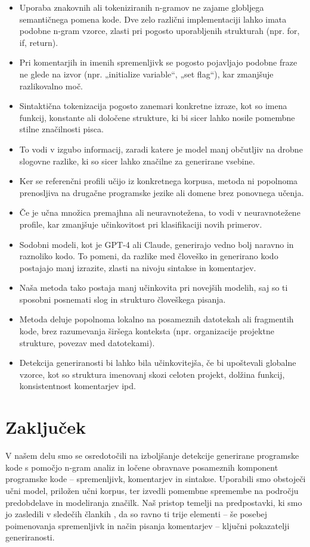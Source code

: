 \documentclass[sigconf,nonacm]{acmart}
\begin{document}
\begin{itemize}
	\item Uporaba znakovnih ali tokeniziranih n-gramov ne zajame globljega semantičnega pomena kode. Dve zelo različni implementaciji lahko imata podobne n-gram vzorce, zlasti pri pogosto uporabljenih strukturah (npr. for, if, return).
	\item Pri komentarjih in imenih spremenljivk se pogosto pojavljajo podobne fraze ne glede na izvor (npr. „initialize variable“, „set flag“), kar zmanjšuje razlikovalno moč.
	\item Sintaktična tokenizacija pogosto zanemari konkretne izraze, kot so imena funkcij, konstante ali določene strukture, ki bi sicer lahko nosile pomembne stilne značilnosti pisca.
	\item To vodi v izgubo informacij, zaradi katere je model manj občutljiv na drobne slogovne razlike, ki so sicer lahko značilne za generirane vsebine.
	\item Ker se referenčni profili učijo iz konkretnega korpusa, metoda ni popolnoma prenosljiva na drugačne programske jezike ali domene brez ponovnega učenja.
	\item Če je učna množica premajhna ali neuravnotežena, to vodi v neuravnotežene profile, kar zmanjšuje učinkovitost pri klasifikaciji novih primerov.
	\item Sodobni modeli, kot je GPT-4 ali Claude, generirajo vedno bolj naravno in raznoliko kodo. To pomeni, da razlike med človeško in generirano kodo postajajo manj izrazite, zlasti na nivoju sintakse in komentarjev.
	\item Naša metoda tako postaja manj učinkovita pri novejših modelih, saj so ti sposobni posnemati slog in strukturo človeškega pisanja.
	\item Metoda deluje popolnoma lokalno na posameznih datotekah ali fragmentih kode, brez razumevanja širšega konteksta (npr. organizacije projektne strukture, povezav med datotekami).
	\item Detekcija generiranosti bi lahko bila učinkovitejša, če bi upoštevali globalne vzorce, kot so struktura imenovanj skozi celoten projekt, dolžina funkcij, konsistentnost komentarjev ipd.
\end{itemize}

\section{Zaključek}
V našem delu smo se osredotočili na izboljšanje detekcije generirane programske kode s pomočjo n-gram analiz in ločene obravnave posameznih komponent programske kode – spremenljivk, komentarjev in sintakse. Uporabili smo obstoječi učni model, priložen učni korpus, ter izvedli pomembne spremembe na področju predobdelave in modeliranja značilk. Naš pristop temelji na predpostavki, ki smo jo zasledili v sledečih člankih \cite{oedingen2024chatgpt, xu2024distinguishing, gurioli2024you}, da so ravno ti trije elementi – še posebej poimenovanja spremenljivk in način pisanja komentarjev – ključni pokazatelji generiranosti.
\end{document}

